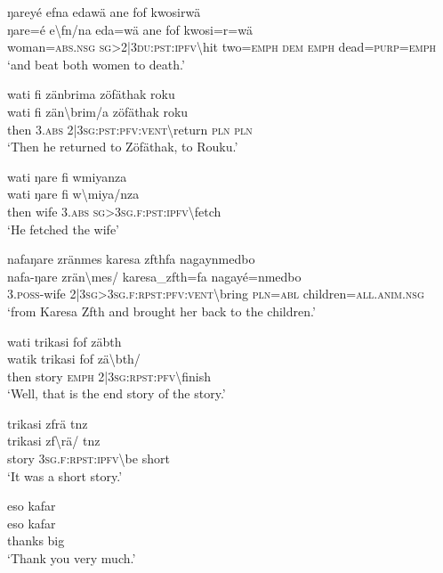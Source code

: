 \ea\label{ex:9:a2345}
ŋareyé efna edawä ane fof kwosirwä\\
\gll ŋare=é	e{\textbackslash}fn/na	eda=wä	ane	fof	kwosi=r=wä\\
     woman=\textsc{abs}.\textsc{nsg}	\textsc{sg}>2|3\textsc{du}:\textsc{pst}:\textsc{ipfv}{\textbackslash}hit	two=\textsc{emph}	\textsc{dem}	\textsc{emph}	dead=\textsc{purp}=\textsc{emph}\\
\glt `and beat both women to death.'
\z

\ea\label{ex:9:a2348}
wati fi zänbrima zöfäthak roku\\
\gll wati	fi	zän{\textbackslash}brim/a	zöfäthak	roku\\
     then	3.\textsc{abs}	2|3\textsc{sg}:\textsc{pst}:\textsc{pfv}:\textsc{vent}{\textbackslash}return	\textsc{pln}	\textsc{pln}\\
\glt `Then he returned to Zöfäthak, to Rouku.'
\z

\ea\label{ex:9:a2350}
wati ŋare fi wmiyanza\\
\gll wati	ŋare	fi	w{\textbackslash}miya/nza\\
     then	wife	3.\textsc{abs}	\textsc{sg}>3\textsc{sg}.\textsc{f}:\textsc{pst}:\textsc{ipfv}{\textbackslash}fetch\\
\glt `He fetched the wife'
\z

\ea\label{ex:9:a2352}
nafaŋare zränmes karesa zfthfa nagaynmedbo\\
\gll nafa-ŋare	zrän{\textbackslash}mes/	karesa\_zfth=fa	nagayé=nmedbo\\
     3.\textsc{poss}-wife	2|3\textsc{sg}>3\textsc{sg}.\textsc{f}:\textsc{rpst}:\textsc{pfv}:\textsc{vent}{\textbackslash}bring	\textsc{pln}=\textsc{abl}	children=\textsc{all}.\textsc{anim}.\textsc{nsg}\\
\glt `from Karesa Zfth and brought her back to the children.'
\z

\ea\label{ex:9:a2353}
wati trikasi fof zäbth\\
\gll watik	trikasi	fof	zä{\textbackslash}bth/\\
     then	story	\textsc{emph}	2|3\textsc{sg}:\textsc{rpst}:\textsc{pfv}{\textbackslash}finish\\
\glt `Well, that is the end story of the story.'
\z

\ea\label{ex:9:a2355}
trikasi zfrä tnz\\
\gll trikasi	zf{\textbackslash}rä/	tnz\\
     story	3\textsc{sg}.\textsc{f}:\textsc{rpst}:\textsc{ipfv}{\textbackslash}be	short\\
\glt `It was a short story.'
\z

\ea\label{ex:9:a2356}
eso kafar\\
\gll eso	kafar\\
     thanks	big\\
\glt `Thank you very much.'
\z
